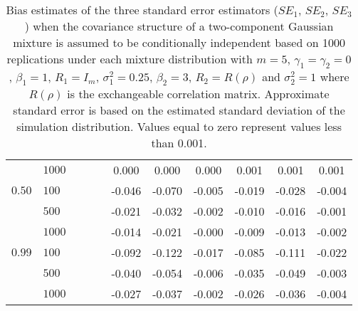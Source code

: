 \begin{landscape}
\begin{table}[ht]
\begin{center}
\begin{tabular}{llccccccccc}
    & $1000$ &   &   &   & 0.000 & 0.000 & 0.000 & 0.001 & 0.001 & 0.001 \\ 
  $0.50$ & $100$ &   &   &   & -0.046 & -0.070 & -0.005 & -0.019 & -0.028 & -0.004 \\ 
    & $500$ &   &   &   & -0.021 & -0.032 & -0.002 & -0.010 & -0.016 & -0.001 \\ 
    & $1000$ &   &   &   & -0.014 & -0.021 & -0.000 & -0.009 & -0.013 & -0.002 \\ 
  $0.99$ & $100$ &   &   &   & -0.092 & -0.122 & -0.017 & -0.085 & -0.111 & -0.022 \\ 
    & $500$ &   &   &   & -0.040 & -0.054 & -0.006 & -0.035 & -0.049 & -0.003 \\ 
    & $1000$ &   &   &   & -0.027 & -0.037 & -0.002 & -0.026 & -0.036 & -0.004 \\ 
   \hline\end{tabular}
\caption{Bias estimates of the three standard error estimators ($SE_1$, $SE_2$, $SE_3$) when the covariance structure of a two-component Gaussian mixture is assumed to be conditionally independent based on 1000 replications under each mixture distribution with $m=5$, $\gamma_1=\gamma_2=0$, $\beta_{1}=1$, $R_1=I_{m}$, $\sigma_1^{2}=0.25$, $\beta_2=3$, $R_2=R(\rho)$ and $\sigma_2^{2}=1$ where $R(\rho)$ is the exchangeable correlation matrix. Approximate standard error is based on the estimated standard deviation of the simulation distribution. Values equal to zero represent values less than 0.001.}
\label{tab:dep2}
\end{center}
\end{table}
\end{landscape}
